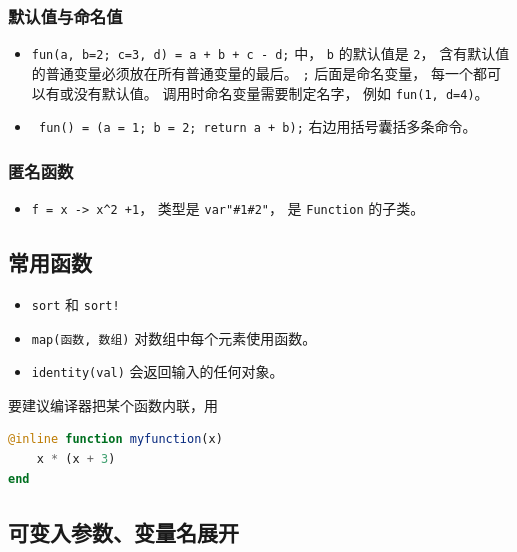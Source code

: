 \subsubsection{默认值与命名值}
\begin{itemize}
\item \verb`fun(a, b=2; c=3, d) = a + b + c - d;` 中， \verb`b` 的默认值是 \verb`2`， 含有默认值的普通变量必须放在所有普通变量的最后。 \verb`;` 后面是命名变量， 每一个都可以有或没有默认值。 调用时命名变量需要制定名字， 例如 \verb`fun(1, d=4)`。
\item \verb` fun() = (a = 1; b = 2; return a + b);` 右边用括号囊括多条命令。
\end{itemize}

\subsubsection{匿名函数}
\begin{itemize}
\item \verb`f = x -> x^2 +1`， 类型是 \verb`var"#1#2"`， 是 \verb`Function` 的子类。
\end{itemize}

\subsection{常用函数}
\begin{itemize}
\item \verb`sort` 和 \verb`sort!`
\item \verb`map(函数, 数组)` 对数组中每个元素使用函数。
\item \verb`identity(val)` 会返回输入的任何对象。
\end{itemize}

要建议编译器把某个函数内联，用
\begin{lstlisting}[language=julia]
@inline function myfunction(x)
    x * (x + 3)
end
\end{lstlisting}

\subsection{可变入参数、变量名展开}